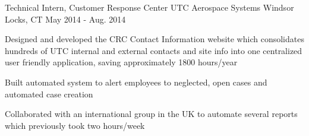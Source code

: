 \begin{cventries}
  \cventry
    {Technical Intern, Customer Response Center} %
    {UTC Aerospace Systems} %
    {Windsor Locks, CT} %
    {May 2014 - Aug. 2014} %
    {
      \begin{cvitems} %
        \item {Designed and developed the CRC Contact Information website which consolidates hundreds of UTC internal and external contacts and site info into one centralized user friendly application, saving approximately 1800 hours/year}
        \item {Built automated system to alert employees to neglected, open cases and automated case creation}
        \item {Collaborated with an international group in the UK to automate several reports which previously took two hours/week}
      \end{cvitems}
    }


\end{cventries}

